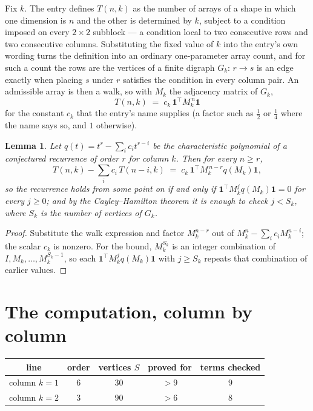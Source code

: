 \documentclass[11pt,a4paper]{article}
\theoremstyle{plain}
\newtheorem{lemma}[theorem]{Lemma}
\theoremstyle{definition}
\begin{document}
Fix $k$. The entry defines $T(n,k)$ as the number of arrays of a shape in which one dimension
is $n$ and the other is determined by $k$, subject to a condition imposed on every
$2\times2$ subblock --- a condition local to two consecutive rows and two consecutive columns.
Substituting the fixed value of $k$ into the entry's own wording turns the definition into an
ordinary one-parameter array count, and for such a count the rows are the vertices of a finite
digraph $G_k$: $r\to s$ is an edge exactly when placing $s$ under $r$ satisfies the condition
in every column pair. An admissible array is then a walk, so with $M_k$ the adjacency matrix
of $G_k$,
\[
T(n,k)\;=\;c_k\,\mathbf{1}^{\!\top}M_k^{\,n}\mathbf{1}
\]
for the constant $c_k$ that the entry's name supplies (a factor such as $\tfrac12$ or
$\tfrac14$ where the name says so, and $1$ otherwise).

\begin{lemma}\label{lem:crit}
Let $q(t)=t^{r}-\sum_i c_it^{r-i}$ be the characteristic polynomial of a conjectured
recurrence of order $r$ for column $k$. Then for every $n\ge r$,
\[
T(n,k)-\sum_i c_i\,T(n-i,k)\;=\;c_k\,\mathbf{1}^{\!\top}M_k^{\,n-r}q(M_k)\mathbf{1},
\]
so the recurrence holds from some point on if and only if
$\mathbf{1}^{\!\top}M_k^{j}q(M_k)\mathbf{1}=0$ for every $j\ge0$; and by the
Cayley--Hamilton theorem it is enough to check $j<S_k$, where $S_k$ is the number of vertices
of $G_k$.
\end{lemma}

\begin{proof}
Substitute the walk expression and factor $M_k^{n-r}$ out of $M_k^{n}-\sum_ic_iM_k^{n-i}$;
the scalar $c_k$ is nonzero. For the bound, $M_k^{S_k}$ is an integer combination of
$I,M_k,\dots,M_k^{S_k-1}$, so each $\mathbf{1}^{\!\top}M_k^{j}q(M_k)\mathbf{1}$ with
$j\ge S_k$ repeats that combination of earlier values.
\end{proof}

\section{The computation, column by column}

\begin{center}
\begin{tabular}{ccccc}
line & order & vertices $S$ & proved for & terms checked \\ \hline
column $k$$=1$ & $6$ & $30$ & $>9$ & $9$ \\
column $k$$=2$ & $3$ & $90$ & $>6$ & $8$ \\
\end{tabular}
\end{center}
\end{document}
